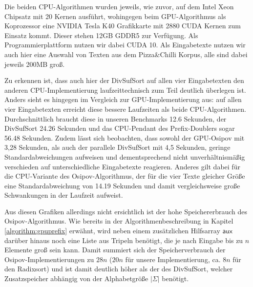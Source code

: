 Die beiden CPU-Algorithmen wurden jeweils, wie zuvor, auf dem Intel\textsuperscript{\textregistered} Xeon\textsuperscript{\textregistered} Chipsatz mit 20 Kernen ausführt, wohingegen beim GPU-Algorithmus als Koprozessor eine NVIDIA\textsuperscript{\textregistered} Tesla K40 Grafikkarte mit 2880 CUDA Kernen zum Einsatz kommt. Dieser stehen 12GB GDDR5 zur Verfügung. Als Programmierplattform nutzen wir dabei CUDA 10. Als Eingabetexte nutzen wir auch hier eine Auswahl von Texten aus dem Pizza$\&$Chilli Korpus, alle sind dabei jeweils 200MB groß.

Zu erkennen ist, dass auch hier der DivSufSort auf allen vier Eingabetexten den anderen CPU-Implementierung laufzeittechnisch zum Teil deutlich überlegen ist. Anders sieht es hingegen im Vergleich zur GPU-Implementierung aus: auf allen vier Eingabetexten erreicht diese bessere Laufzeiten als beide CPU-Algorithmen. Durchschnittlich braucht diese in unseren Benchmarks 12.6 Sekunden, der DivSufSort 24.26 Sekunden und das CPU-Pendant des Prefix-Doublers sogar 56.48 Sekunden. 
Zudem lässt sich beobachten, dass sowohl der GPU-Osipov mit 3,28 Sekunden, als auch der parallele DivSufSort mit 4,5 Sekunden, geringe Standardabweichungen aufweisen und dementsprechend nicht unverhältnismäßig verschieden auf unterschiedliche Eingabetexte reagieren. Anderes gilt dabei für die CPU-Variante des Osipov-Algorithmus, der für die vier Texte gleicher Größe eine Standardabweichung von 14.19 Sekunden und damit vergleichsweise große Schwankungen in der Laufzeit aufweist.

Aus diesen Grafiken allerdings nicht ersichtlich ist der hohe Speichererbrauch des Osipov-Algorithmus. Wie bereits in der Algorithmenbeschreibung in Kapitel \ref{algorithm:gpuprefix} erwähnt, wird neben einem zusätzlichen Hilfsarray $\mathsf{aux}$ darüber hinaus noch eine Liste aus Tripeln benötigt, die je nach Eingabe bis zu $n$ Elemente groß sein kann. Damit summiert sich der Speicherverbrauch der Osipov-Implementierungen zu $28n$ ($20n$ für unsere Implementierung, ca. $8n$ für den Radixsort) und ist damit deutlich höher als der des DivSufSort, welcher Zusatzspeicher abhängig von der Alphabetgröße $|\Sigma|$ benötigt.

